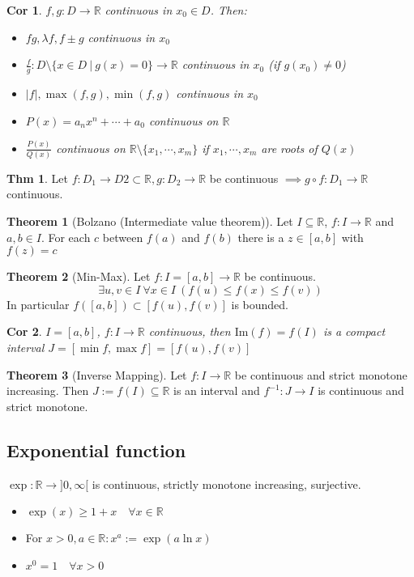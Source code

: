 \documentclass[a4paper, 10pt]{article}
\newtheorem*{corollary}{Cor}
\theoremstyle{definition}
\newtheorem*{theorem}{Thm}
\theoremstyle{ex}
\theoremstyle{named}
\newtheorem*{ntheorem_wrapper}{Theorem}
\newenvironment{ntheorem}%
    {\begin{mdframed}[style=important]\begin{ntheorem_wrapper}}%
    {\end{ntheorem_wrapper}\end{mdframed}}
\newcommand{\R}{\mathbb{R}}
\begin{document}
\begin{corollary}
    $f, g: D \to \R$ continuous in $x_0 \in D$. Then:
    \begin{itemize}
        \item $fg, \lambda f, f \pm g$ continuous in $x_0$
        \item $\frac{f}{g}: D \setminus \{x \in D \ | \ g(x) = 0\} \to \R$ continuous in $x_0$ (if $g(x_0) \neq 0$)
        \item $|f|, \max(f, g), \min(f, g)$ continuous in $x_0$
        \item $P(x) = a_n x^n + \cdots + a_0$ continuous on $\R$
        \item $\frac{P(x)}{Q(x)}$ continuous on $\R \setminus \{x_1, \cdots, x_m\}$ if $x_1, \cdots, x_m$ are roots of $Q(x)$
    \end{itemize}
\end{corollary}

\begin{theorem}
    Let $f: D_1 \to D2 \subset \R, g: D_2 \to \R$ be continuous $\implies g \circ f : D_1 \to \R$ continuous.
\end{theorem}

\begin{ntheorem}[Bolzano (Intermediate value theorem)]
    Let $I \subseteq \R$, $f : I \to \R$ and $a, b \in I$. For each $c$ between $f(a)$ and $f(b)$ there is a $z \in [a, b]$ with $f(z) = c$
\end{ntheorem}

\begin{ntheorem}[Min-Max]
    Let $f: I = [a, b] \to \R$ be continuous.
    $$\exists u, v \in I \ \forall x \in I \ (f(u) \leq f(x) \leq f(v))$$
    In particular $f([a, b]) \subset [f(u), f(v)]$ is bounded.
\end{ntheorem}

\begin{corollary}
    $I = [a, b]$, $f: I \to \R$ continuous, then $\text{Im}(f) = f(I)$ is a compact interval $J = [\min f, \max f] = [f(u), f(v)]$
\end{corollary}

\begin{ntheorem}[Inverse Mapping]
    Let $f: I \to \R$ be continuous and strict monotone increasing. Then $J := f(I) \subseteq \R$ is an interval and $f^{-1}: J \to I$ is continuous and strict monotone.
\end{ntheorem}

\subsection{Exponential function}
$\exp: \R \to ]0, \infty [$ is continuous, strictly monotone increasing, surjective.
\begin{itemize}
    \item $\exp(x) \geq 1 + x \quad \forall x \in \R$
    \item For $x > 0, a \in \R: x^a := \exp(a \ln x)$
    \item $x^0 = 1 \quad \forall x > 0$
\end{itemize}
\end{document}
